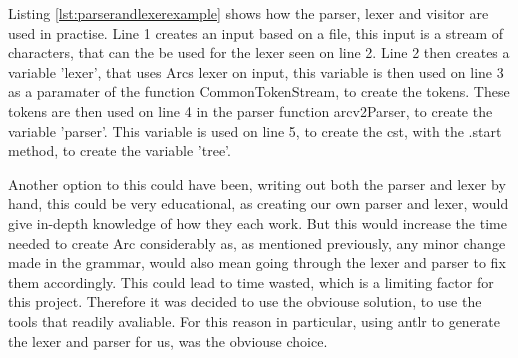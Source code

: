 Listing \ref{lst:parserandlexerexample} shows how the parser, lexer and visitor are used in practise. Line 1 creates an input based on a file, this input is a stream of characters, that can the be used for the lexer seen on line 2. Line 2 then creates a variable 'lexer', that uses Arcs lexer on input, this variable is then used on line 3 as a paramater of the function CommonTokenStream, to create the tokens. These tokens are then used on line 4 in the parser function arcv2Parser, to create the variable 'parser'. This variable is used on line 5, to create the \gls{cst}, with the .start method, to create the variable 'tree'. 


Another option to this could have been, writing out both the parser and lexer by hand, this could be very educational, as creating our own parser and lexer, would give in-depth knowledge of how they each work. But this would increase the time needed to create Arc considerably as, as mentioned previously, any minor change made in the grammar, would also mean going through the lexer and parser to fix them accordingly. This could lead to time wasted, which is a limiting factor for this project. Therefore it was decided to use the obviouse solution, to use the tools that readily avaliable. For this reason in particular, using \gls{antlr} to generate the lexer and parser for us, was the obviouse choice.

